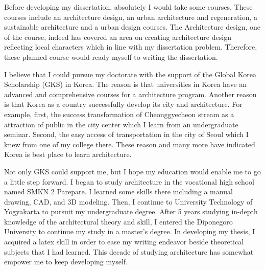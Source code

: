 \documentclass[11pt]{simart} %
\begin{document}
Before developing my dissertation, absolutely I would take some courses. These courses include an architecture design, an urban architecture and regeneration, a sustainable architecture and a urban design courses.
The Architecture design, one of the course, indeed has covered an area on creating architecture design reflecting local characters which in line with my dissertation problem. Therefore, these planned course would ready myself to writing the dissertation.

I believe that I could pursue my doctorate with the support of the Global Korea Scholarship (GKS) in Korea. The reason is that universities in Korea have an advanced and comprehensive courses for a architecture program. Another reason is that Korea as a country successfully develop its city and architecture.
For example, first, the success transformation of Cheonggyecheon stream as a attraction of public in the city center which I learn from an undergraduate seminar.
Second, the easy access of transportation in the city of Seoul which I knew from one of my college there. These reason and many more have indicated Korea is best place to learn architecture.


Not only GKS could support me, but I hope my education would enable me to go a little step forward. I began to study architecture in the vocational high school named SMKN 2 Parepare. I learned some skills there including a manual drawing, CAD, and 3D modeling. Then, I continue to University Technology of Yogyakarta to pursuit my undergraduate degree. After 5 years studying in-depth knowledge of the architectural theory and skill, I entered the Diponegoro University to continue my study in a master's degree. In developing my thesis, I acquired a latex skill in order to ease my writing endeavor beside theoretical subjects that I had learned.
This decade of studying architecture has somewhat empower me to keep developing myself.


\end{document}
